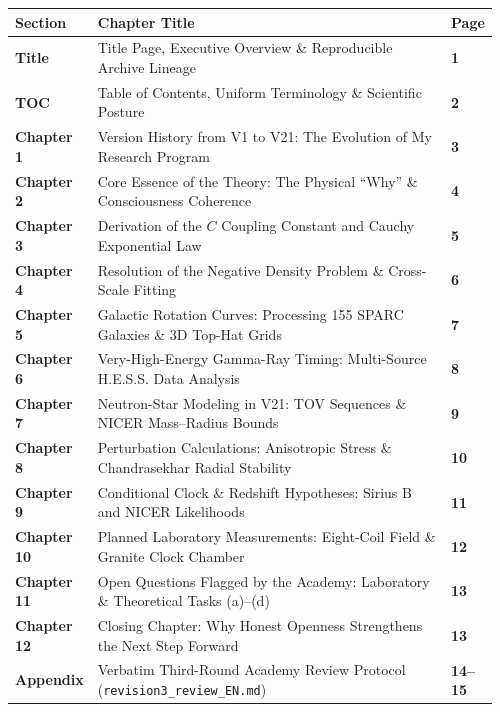 \documentclass[10pt,a4paper]{article}
\begin{document}
\par\vspace{1pt}
{\footnotesize
\begin{tabular}{@{}>{\bfseries\color{navy}}p{0.12\linewidth}p{0.76\linewidth}>{\raggedleft\arraybackslash\bfseries}p{0.08\linewidth}@{}}
\toprule
Section & Chapter Title & Page \\
\midrule
Title & Title Page, Executive Overview \& Reproducible Archive Lineage & 1 \\
TOC & Table of Contents, Uniform Terminology \& Scientific Posture & 2 \\
Chapter 1 & Version History from V1 to V21: The Evolution of My Research Program & 3 \\
Chapter 2 & Core Essence of the Theory: The Physical ``Why'' \& Consciousness Coherence & 4 \\
Chapter 3 & Derivation of the $C$ Coupling Constant and Cauchy Exponential Law & 5 \\
Chapter 4 & Resolution of the Negative Density Problem \& Cross-Scale Fitting & 6 \\
Chapter 5 & Galactic Rotation Curves: Processing 155 SPARC Galaxies \& 3D Top-Hat Grids & 7 \\
Chapter 6 & Very-High-Energy Gamma-Ray Timing: Multi-Source H.E.S.S. Data Analysis & 8 \\
Chapter 7 & Neutron-Star Modeling in V21: TOV Sequences \& NICER Mass--Radius Bounds & 9 \\
Chapter 8 & Perturbation Calculations: Anisotropic Stress \& Chandrasekhar Radial Stability & 10 \\
Chapter 9 & Conditional Clock \& Redshift Hypotheses: Sirius B and NICER Likelihoods & 11 \\
Chapter 10 & Planned Laboratory Measurements: Eight-Coil Field \& Granite Clock Chamber & 12 \\
Chapter 11 & Open Questions Flagged by the Academy: Laboratory \& Theoretical Tasks (a)--(d) & 13 \\
Chapter 12 & Closing Chapter: Why Honest Openness Strengthens the Next Step Forward & 13 \\
Appendix & Verbatim Third-Round Academy Review Protocol (\texttt{revision3\_review\_EN.md}) & 14--15 \\
\bottomrule
\end{tabular}}
\end{document}
